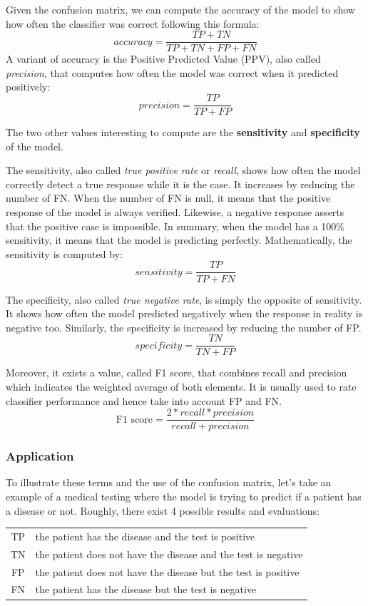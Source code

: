 \documentclass[11pt, openany]{report}
\theoremstyle{plain}
\theoremstyle{definition}
\theoremstyle{remark}
\begin{document}
Given the confusion matrix, we can compute the accuracy of the model to show how often the classifier was correct following this formula: 
$$ accuracy = \frac{TP + TN}{TP + TN + FP + FN} $$
A variant of accuracy is the Positive Predicted Value (PPV), also called \textit{precision}, that computes how often the model was correct when it predicted positively: 
$$ precision = \frac{TP}{TP + FP} $$ 

The two other values interesting to compute are the \textbf{sensitivity} and \textbf{specificity} of the model. 

The sensitivity, also called \textit{true positive rate} or \textit{recall}, shows how often the model correctly detect a true response while it is the case. It increases by reducing the number of FN. When the number of FN is null, it means that the positive response of the model is always verified. Likewise, a negative response asserts that the positive case is impossible. In summary, when the model has a 100\% sensitivity, it means that the model is predicting perfectly. Mathematically, the sensitivity is computed by: 
$$ sensitivity = \frac{TP}{TP + FN} $$ 

The specificity, also called \textit{true negative rate}, is simply the opposite of sensitivity. It shows how often the model predicted negatively when the response in reality is negative too. Similarly, the specificity is increased by reducing the number of FP.
$$ specificity = \frac{TN}{TN + FP} $$ 


Moreover, it exists a value, called {F1 score}, that combines recall and precision which indicates the weighted average of both elements. It is usually used to rate classifier performance and hence take into account FP and FN. 
$$ \text{F1 score} = \frac{2*recall*precision}{recall+precision} $$

\subsubsection{Application} \label{sec:appli-confusion-matrix}
To illustrate these terms and the use of the confusion matrix, let's take an example of a medical testing where the model is trying to predict if a patient has a disease or not. Roughly, there exist 4 possible results and evaluations: 
\begin{center}
    \begin{tabular}{cl}
      TP & the patient has the disease and the test is positive\\
      TN & the patient does not have the disease and the test is negative \\
      FP & the patient does not have the disease but the test is positive \\
      FN & the patient has the disease but the test is negative \\
    \end{tabular}
\end{center}
\end{document}
